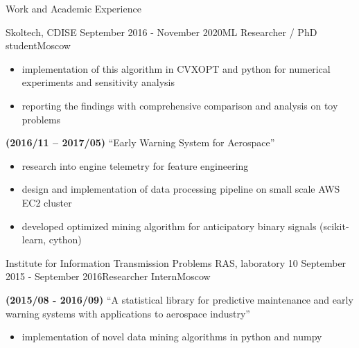\documentclass{resume} %
\begin{document}
\begin{rSection}{Work and Academic Experience}
\begin{rSubsection}{
        Skoltech, CDISE
    }{September 2016 - November 2020}{ML Researcher / PhD student}{Moscow}
\begin{itemize}
        \item implementation of this algorithm in CVXOPT and python for numerical experiments and sensitivity analysis

        \item reporting the findings with comprehensive comparison and analysis on toy problems
    \end{itemize}

    \item \textbf{(2016/11 -- 2017/05)}
    ``Early Warning System for Aerospace''
    \begin{itemize}
        \item research into engine telemetry for feature engineering
        
        \item design and implementation of data processing pipeline on small scale AWS EC2 cluster

        \item developed optimized mining algorithm for anticipatory binary signals (scikit-learn, cython)
    \end{itemize}

\end{rSubsection}

\begin{rSubsection}{
        Institute for Information Transmission Problems RAS, laboratory 10
    }{September 2015 - September 2016}{Researcher Intern}{Moscow}

    \item \textbf{(2015/08 - 2016/09)}
    ``A statistical library for predictive maintenance and early warning systems with applications to aerospace industry''
    \begin{itemize}
        \item implementation of novel data mining algorithms in python and numpy


\end{itemize}
\end{rSubsection}
\end{rSection}
\end{document}

